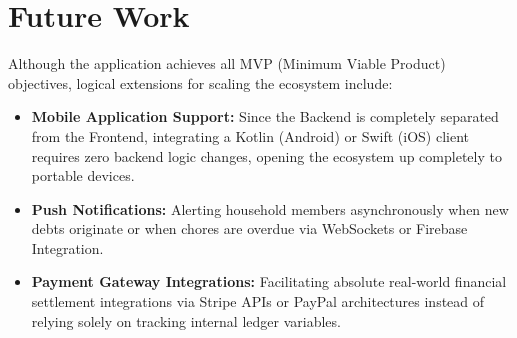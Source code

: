 \section{Future Work}
Although the application achieves all MVP (Minimum Viable Product) objectives, logical extensions for scaling the ecosystem include:
\begin{itemize}
    \item \textbf{Mobile Application Support:} Since the Backend is completely separated from the Frontend, integrating a Kotlin (Android) or Swift (iOS) client requires zero backend logic changes, opening the ecosystem up completely to portable devices.
    \item \textbf{Push Notifications:} Alerting household members asynchronously when new debts originate or when chores are overdue via WebSockets or Firebase Integration.
    \item \textbf{Payment Gateway Integrations:} Facilitating absolute real-world financial settlement integrations via Stripe APIs or PayPal architectures instead of relying solely on tracking internal ledger variables.
\end{itemize}
